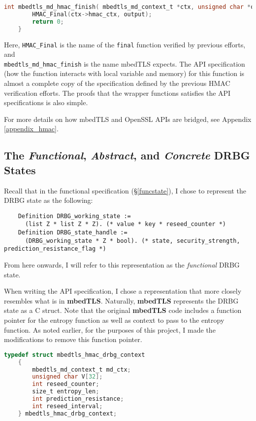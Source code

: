 \documentclass[pageno]{jpaper}
\newcommand{\stdtitle}[1]{\textbf{#1}}
\begin{document}
\begin{lstlisting}[language=C]
    int mbedtls_md_hmac_finish( mbedtls_md_context_t *ctx, unsigned char *output) {
        HMAC_Final(ctx->hmac_ctx, output);
        return 0;
    }
\end{lstlisting}


Here, \lstinline{HMAC_Final} is the name of the \lstinline{final} function verified by previous efforts, and\\ \lstinline{mbedtls_md_hmac_finish} is the name mbedTLS expects. The API specification (how the function interacts with local variable and memory) for this function is almost a complete copy of the specification defined by the previous HMAC verification efforts. The proofs that the wrapper functions satisfies the API specifications is also simple.

For more details on how mbedTLS and OpenSSL APIs are bridged, see Appendix \ref{appendix_hmac}.


\subsection{The \textit{Functional}, \textit{Abstract}, and \textit{Concrete} DRBG States}

Recall that in the functional specification (\S \ref{funcstate}), I chose to represent the DRBG state as the following:

\begin{lstlisting}
    Definition DRBG_working_state :=
      (list Z * list Z * Z). (* value * key * reseed_counter *)
    Definition DRBG_state_handle :=
      (DRBG_working_state * Z * bool). (* state, security_strength, prediction_resistance_flag *)
\end{lstlisting}


From here onwards, I will refer to this representation as the \textit{functional} DRBG state.

When writing the API specification, I chose a representation that more closely resembles what is in \stdtitle{mbedTLS}. Naturally, \stdtitle{mbedTLS} represents the DRBG state as a C struct. Note that the original \stdtitle{mbedTLS} code includes a function pointer for the entropy function as well as context to pass to the entropy function. As noted earlier, for the purposes of this project, I made the modifications to remove this function pointer.

\begin{lstlisting}[language=C]
    typedef struct mbedtls_hmac_drbg_context
    {
        mbedtls_md_context_t md_ctx;
        unsigned char V[32];
        int reseed_counter;
        size_t entropy_len;
        int prediction_resistance;
        int reseed_interval;
    } mbedtls_hmac_drbg_context;
\end{lstlisting}
\end{document}
